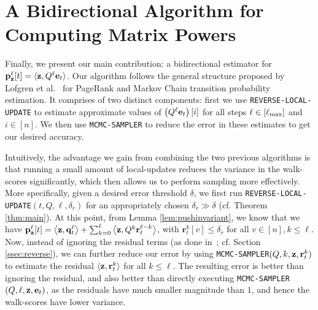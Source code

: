 
\section{A Bidirectional Algorithm for Computing Matrix Powers}
\label{ssec:bidiralgo}

Finally, we present our main contribution: a bidirectional estimator for ${\mathbf{p}}_\mathbf{z}^{\ell}[t] = \langle\mathbf{z},Q^{\ell}\mathbf{e}_t\rangle$. 
Our algorithm follows the general structure proposed by Lofgren et al.~\cite{Lofgren2014,banerjee2015fast} for PageRank and Markov Chain transition probability estimation.
It comprises of two distinct components: first we use  \texttt{REVERSE-LOCAL-UPDATE} to estimate approximate values of $\left(Q^{\ell}\mathbf{e}_t\right)[i]$ for all steps $\ell \in[\ell_{\max}]$ and $i\in[n]$. 
We then use \texttt{MCMC-SAMPLER} to reduce the error in these estimates to get our desired accuracy.


Intuitively, the advantage we gain from combining the two previous algorithms is that running a small amount of local-updates reduces the variance in the walk-scores significantly, which then allows us to perform sampling more effectively.
More specifically, given a desired error threshold $\delta$, we first run \texttt{REVERSE-LOCAL-UPDATE}$(t,Q,\ell,\delta_r)$ for an appropriately chosen $\delta_r\gg\delta$ (cf. Theorem \ref{thm:main}). 
At this point, from Lemma \ref{lem:pushinvariant}, we know that we have
${\mathbf{p}}_\mathbf{z}^{\ell}[t] = \left< \mathbf{z}, \mathbf{q}_t^{\ell} \right> + \sum_{k=0}^{\ell} \left< \mathbf{z}, Q^k\mathbf{r}_t^{\ell-k} \right>$, with $\mathbf{r}_t^{k}[v]\leq\delta_r$ for all $v\in[n],k\leq\ell$.
Now, instead of ignoring the residual terms (as done in~\cite{andersen2007local,lee2014asynchronous}; cf. Section \ref{ssec:reverse}), we can further reduce our error by using \texttt{MCMC-SAMPLER}$(Q,k,\mathbf{z},\mathbf{r}_t^k)$ to estimate the residual $\langle\mathbf{z},\mathbf{r}_t^k\rangle$ for all $k\leq\ell$.
The resulting error is better than ignoring the residual, and also better than directly executing \texttt{MCMC-SAMPLER}$(Q,\ell,\mathbf{z},\mathbf{e}_{t})$, as the residuals have much smaller magnitude than $1$, and hence the walk-scores have lower variance.

